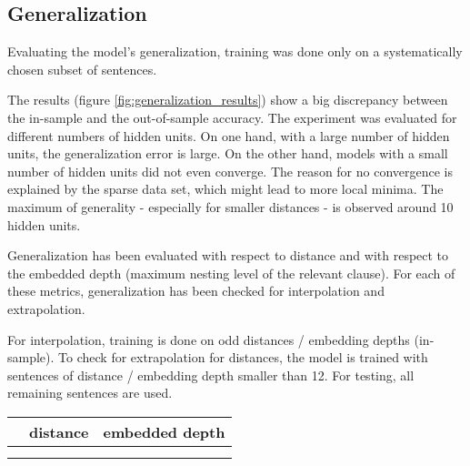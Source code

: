 \documentclass[11pt,a4paper]{article}
\newlength\figureheight
\newlength\figurewidth
\begin{document}
\subsection{Generalization}
\label{subsec:generalization}

Evaluating the model's generalization, training was done only on a systematically chosen subset of sentences.

The results (figure \ref{fig:generalization_results}) show a big discrepancy between the in-sample and the out-of-sample accuracy. The experiment was evaluated for different numbers of hidden units. On one hand, with a large number of hidden units, the generalization error is large. On the other hand, models with a small number of hidden units did not even converge. The reason for no convergence is explained by the sparse data set, which might lead to more local minima. The maximum of generality - especially for smaller distances - is observed around 10 hidden units.

Generalization has been evaluated with respect to distance and with respect to the embedded depth (maximum nesting level of the relevant clause). For each of these metrics, generalization has been checked for interpolation and extrapolation.

For interpolation, training is done on odd distances / embedding depths (in-sample). To check for extrapolation for distances, the model is trained with sentences of distance / embedding depth smaller than 12. For testing, all remaining sentences are used.

\setlength\figureheight{4cm}
\setlength{}
\begin{figure*}[ht]
    \bgroup
    \def\arraystretch{1.5}%
    \begin{tabular}{c|c c}
        & distance & embedded depth\\
        \hline
        \raisebox{0.45in}{\rotatebox{90}{interpolation}} &
         & \\
        \raisebox{0.45in}{\rotatebox{90}{extrapolation}} &  &
        
    \end{tabular}
    \egroup
    \caption{Test for generalization: The error rate of the model with 10 hidden units if only half of the corpus is systematically selected for training (in-sample), while during testing also the left out distances were considered (out-of-sample).}%
    \label{fig:generalization_results}%
\end{figure*}
\end{document}
